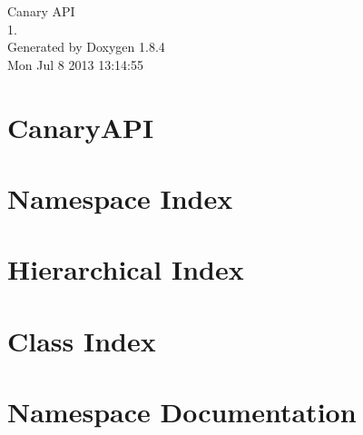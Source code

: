 \documentclass[twoside]{book}
\newcommand{\clearemptydoublepage}{%
  \newpage{\pagestyle{empty}\cleardoublepage}%
}
\begin{document}
\hypersetup{pageanchor=false}
\begin{titlepage}
\vspace*{7cm}
\begin{center}%
{\Large Canary A\-P\-I \\[1ex]\large 1. }\\
\vspace*{1cm}
{\large Generated by Doxygen 1.8.4}\\
\vspace*{0.5cm}
{\small Mon Jul 8 2013 13:14:55}\\
\end{center}
\end{titlepage}
\clearemptydoublepage
\tableofcontents
\clearemptydoublepage
{}
\hypersetup{pageanchor=true}

\chapter{Canary\-A\-P\-I}
\label{md_README}
\hypertarget{md_README}{}

\chapter{Namespace Index}

\chapter{Hierarchical Index}

\chapter{Class Index}

\chapter{Namespace Documentation}















\end{document}
